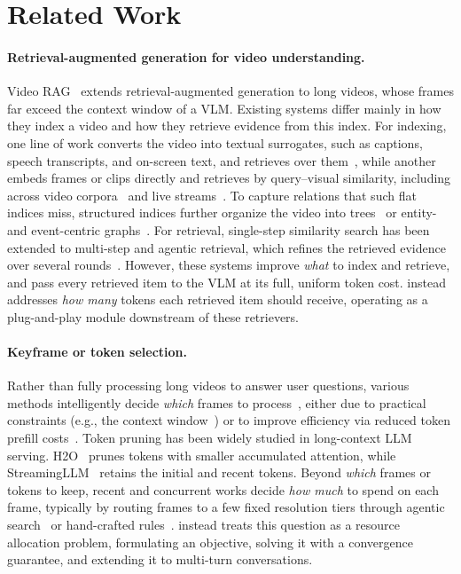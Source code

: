 


\section{Related Work}
\label{sec:related}

\paragraph{Retrieval-augmented generation for video understanding.}
Video RAG~\cite{lewis2020retrieval} extends retrieval-augmented generation to long videos, whose frames far exceed the context window of a VLM. Existing systems differ mainly in how they index a video and how they retrieve evidence from this index. For indexing, one line of work converts the video into textual surrogates, such as captions, speech transcripts, and on-screen text, and retrieves over them~\cite{ma2024drvideo,luo2024videorag}, while another embeds frames or clips directly and retrieves by query--visual similarity, including across video corpora~\cite{jeong2025videorag} and live streams~\cite{xie2026streamrag}. To capture relations that such flat indices miss, structured indices further organize the video into trees~\cite{wang2024videotree} or entity- and event-centric graphs~\cite{ren2025videorag,shen2025vgent,yan2025ava}. For retrieval, single-step similarity search has been extended to multi-step and agentic retrieval, which refines the retrieved evidence over several rounds~\cite{shen2025vgent,yan2025ava}. However, these systems improve \emph{what} to index and retrieve, and pass every retrieved item to the VLM at its full, uniform token cost. \name instead addresses \emph{how many} tokens each retrieved item should receive, operating as a plug-and-play module downstream of these retrievers.

\paragraph{Keyframe or token selection.} Rather than fully processing long videos to answer user questions, various methods intelligently decide \emph{which} frames to process~\cite{tang2025aks,zhu2026focus,li2026dig,liu2025bolt,sun2025mdp3,shi2026markey,peng2026qca,yu2024framevoyager,wang2026dafs}, either due to practical constraints (e.g., the context window~\cite{zhang2024longva}) or to improve efficiency via reduced token prefill costs~\cite{chen2024fastv,yang2024visionzip}. Token pruning has been widely studied in long-context LLM serving. H2O~\cite{h2o-neurips23} prunes tokens with smaller accumulated attention, while StreamingLLM~\cite{streamingllm-iclr24} retains the initial and recent tokens. Beyond \emph{which} frames or tokens to keep, recent and concurrent works decide \emph{how much} to spend on each frame, typically by routing frames to a few fixed resolution tiers through agentic search~\cite{an2026adaalloc} or hand-crafted rules~\cite{zhang2025qframe, luo2025quota}. \name instead treats this question as a resource allocation problem, formulating an objective, solving it with a convergence guarantee, and extending it to multi-turn conversations.

